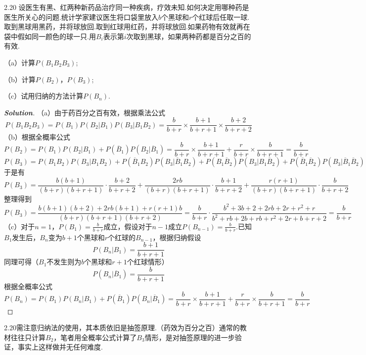 \documentclass[10pt, a4paper, oneside]{ctexart}
\newenvironment{solution}{\begin{proof}[\bf Solution]}{\end{proof}}
\begin{document}
2.20 设医生有黑、红两种新药品治疗同一种疾病，疗效未知.如何决定用哪种药是医生所关心的问题.统计学家建议医生将口袋里放入$b$个黑球和$r$个红球后任取一球.取到黑球用黑药，并将球放回.取到红球用红药，并将球放回.如果药物有效就再在袋中假如同一颜色的球一只.用$B_i$表示第$i$次取到黑球，如果两种药都是百分之百的有效.

（a）计算$P(B_1B_2B_3)$;

（b）计算$P(B_2)$，$P(B_3)$;

（c）试用归纳的方法计算$P(B_n)$.
\begin{solution}
（a）由于药百分之百有效，根据乘法公式
\[P({B_1}{B_2}{B_3}) = P({B_1})P({B_2}|{B_1})P({B_3}|{B_1}{B_2}) = \frac{b}{{b + r}} \times \frac{{b + 1}}{{b + r + 1}} \times \frac{{b + 2}}{{b + r + 2}}\]
（b）根据全概率公式
\[P({B_2}) = P({B_1})P({B_2}|{B_1}) + P({\overline B _1})P({B_2}|{\overline B _1}) = \frac{b}{{b + r}} \times \frac{{b + 1}}{{b + r + 1}} + \frac{r}{{b + r}} \times \frac{b}{{b + r + 1}} = \frac{b}{{b + r}}\]
\[P({B_3}) = P({B_1}{B_2})P({B_3}|{B_1}{B_2}) + P({\overline B _1}{B_2})P({B_3}|{\overline B _1}{B_2}) + P({B_1}{\overline B _2})P({B_3}|{B_1}{\overline B _2}) + P({\overline B _1}{\overline B _2})P({B_3}|{\overline B _1}{\overline B _2})\]
于是有
\[P({B_3}) = \frac{{b(b + 1)}}{{(b + r)(b + r + 1)}} \cdot \frac{{b + 2}}{{b + r + 2}} + \frac{{2rb}}{{(b + r)(b + r + 1)}} \cdot \frac{{b + 1}}{{b + r + 2}} + \frac{{r(r + 1)}}{{(b + r)(b + r + 1)}} \cdot \frac{b}{{b + r + 2}}\]
整理得到
\[P({B_3}) = \frac{{b(b + 1)(b + 2) + 2rb(b + 1) + r(r + 1)b}}{{(b + r)(b + r + 1)(b + r + 2)}} = \frac{b}{{b + r}} \cdot \frac{{{b^2} + 3b + 2 + 2rb + 2r + {r^2} + r}}{{{b^2} + rb + 2b + rb + {r^2} + 2r + b + r + 2}} = \frac{b}{{b + r}}\]
（c）对于$n=1$，$P(B_1)=\frac{b}{b+r}$成立，假设对于$n-1$成立$P(B_{n-1})=\frac{b}{b+r}$.已知$B_1$发生后，$B_n$变为$b+1$个黑球和$r$个红球的$B_{n-1}$，根据归纳假设
\[P({B_n}|{B_1}) = \frac{{b + 1}}{{b + r + 1}}\]
同理可得（$B_1$不发生则为$b$个黑球和$r+1$个红球情形）
\[P({B_n}|{\overline B _1}) = \frac{b}{{b + r + 1}}\]
根据全概率公式
\[P({B_n}) = P({B_1})P({B_n}|{B_1}) + P({\overline B _1})P({B_n}|{\overline B _1}) = \frac{b}{{b + r}} \times \frac{{b + 1}}{{b + r + 1}} + \frac{r}{{b + r}} \times \frac{b}{{b + r + 1}} = \frac{b}{{b + r}}\]
\end{solution}
\begin{remark}
2.20需注意归纳法的使用，其本质依旧是抽签原理.（药效为百分之百）通常的教材往往只计算$B_2$，笔者用全概率公式计算了$B_3$情形，是对抽签原理的进一步验证，事实上这样做并无任何难度.
\end{remark}
\end{document}
